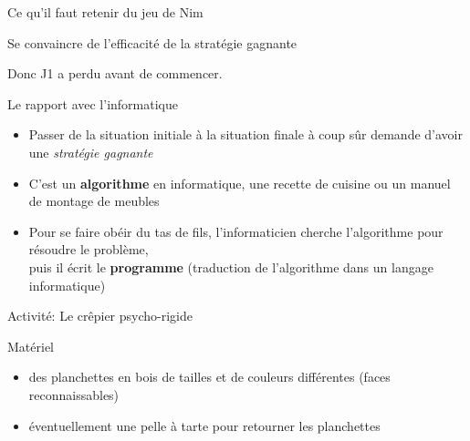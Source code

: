 \documentclass[final,hyperref={pdfpagelabels=false}]{beamer}
\renewenvironment{Coupe}{   }{   }
\begin{document}
\begin{Coupe}
\begin{frame}{Ce qu'il faut retenir du jeu de Nim}
\begin{block}{Se convaincre de l'efficacité de la stratégie gagnante}
    Donc J1 a perdu avant de commencer.
  \end{block}

  \begin{block}{Le rapport avec l'informatique}
    \begin{itemize}
    \item Passer de la situation initiale à la situation finale à coup sûr demande d'avoir
      une \textit{stratégie gagnante}
    \item C'est un \alert{\textbf{algorithme}} en informatique, une recette de
      cuisine ou un manuel de montage de meubles
    \item Pour se faire obéir du tas de fils, l'informaticien cherche
      l'algorithme pour résoudre le problème,\\
      puis il écrit le \alert{\textbf{programme}} (traduction de l'algorithme
      dans un langage informatique)
    \end{itemize}
  \end{block}
\end{frame}
\begin{frame}{Activité: Le crêpier psycho-rigide}

  \begin{block}{Matériel}
    \begin{itemize}
    \item des planchettes en bois de tailles et de couleurs différentes (faces reconnaissables)
    \item éventuellement une pelle à tarte pour retourner les planchettes
    \end{itemize}
  \end{block}


\end{frame}
\end{Coupe}
\end{document}

